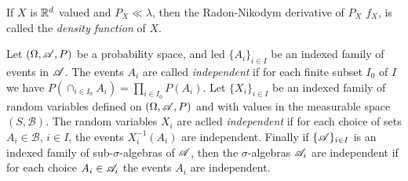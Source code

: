 \documentclass[12pt]{article}
\begin{document}
\begin{definition}
    If $X$ is $\mathbb{R}^d$ valued and $P_X\ll\lambda$, then the Radon-Nikodym derivative of $P_X$ $f_X$, is called the \textit{density function} of $X$.
\end{definition}
\begin{definition}[Independence]
    Let $(\Omega,\mathscr{A},P)$ be a probability space, and led $\{A_i\}_{i\in I}$ be an indexed family of events in $\mathscr{A}$. The events $A_i$ are called \textit{independent} if for each finite subset $I_0$ of $I$ we have $P(\cap_{i\in I_0} A_i)=\prod_{i\in I_0} P(A_i)$. Let $\{X_i\}_{i\in I}$ be an indexed family of random variables defined on $(\Omega,\mathscr{A},P)$ and with values in the measurable space $(S,\mathscr{B})$. The random variables $X_i$ are aclled \textit{independent} if for each choice of sets $A_i\in\mathscr{B}$, $i\in I$, the events $X_i^{-1}(A_i)$ are independent. Finally if $\{\mathscr{A}\}_{i\in I}$ is an indexed family of sub-$\sigma$-algebras of $\mathscr{A}$, then the $\sigma$-algebras $\mathscr{A}_i$ are independent if for each choice $A_i\in\mathscr{A}_i$ the events $A_i$ are independent.
\end{definition}
\end{document}
